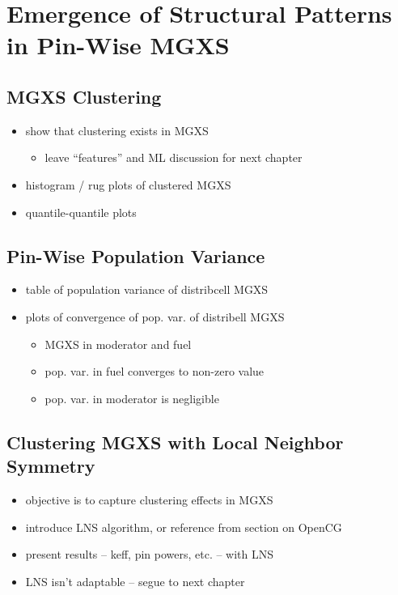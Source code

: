 \chapter{Emergence of Structural Patterns in Pin-Wise MGXS}
\label{chap:spatial}

\section{MGXS Clustering}

\begin{itemize}[noitemsep]
  \item show that clustering exists in MGXS
  \begin{itemize}[noitemsep]
    \item leave ``features'' and ML discussion for next chapter
  \end{itemize}
  \item histogram / rug plots of clustered MGXS
  \item quantile-quantile plots  
\end{itemize}


\section{Pin-Wise Population Variance}

\begin{itemize}[noitemsep]
  \item table of population variance of distribcell MGXS
  \item plots of convergence of pop. var. of distribell MGXS
  \begin{itemize}[noitemsep]
    \item MGXS in moderator and fuel
    \item pop. var. in fuel converges to non-zero value
    \item pop. var. in moderator is negligible
  \end{itemize}
\end{itemize}


\section{Clustering MGXS with Local Neighbor Symmetry}

\begin{itemize}[noitemsep]
  \item objective is to capture clustering effects in MGXS
  \item introduce LNS algorithm, or reference from section on OpenCG
  \item present results -- keff, pin powers, etc. -- with LNS
  \item LNS isn't adaptable -- segue to next chapter
\end{itemize}
